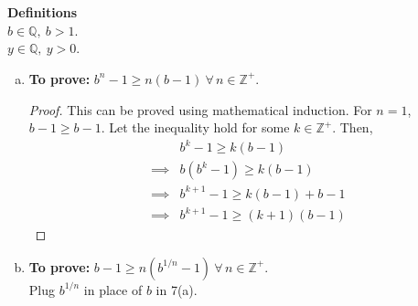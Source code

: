 \documentclass[12pt]{article}
\begin{document}
\section{}
 {\bf Definitions}\\
$b\in \mathbb{Q},\ b > 1$.\\
$y\in \mathbb{Q},\ y > 0$.

\begin{enumerate}[(a)]
      \item
            {\bf To prove:} $b^n-1 \ge n(b-1) \ \forall \, n \in \mathbb{Z}^+$.
            \begin{proof}
                  This can be proved using mathematical induction. For $n=1$,
                  $b-1 \ge b-1$. Let the inequality hold for some $k \in \mathbb{Z}^+$. Then,
                  \begin{align*}
                                 & b^k-1 \ge k(b-1)            \\
                        \implies & b(b^k -1) \ge k(b-1)        \\
                        \implies & b^{k+1} -1 \ge k(b-1) + b-1 \\
                        \implies & b^{k+1} -1 \ge (k+1)(b-1)
                  \end{align*}
            \end{proof}
      \item
            {\bf To prove:} $b-1 \ge n(b^{1/n}-1)\ \forall \, n \in \mathbb{Z}^+$.\\
            Plug $b^{1/n}$ in place of $b$ in 7(a).


\end{enumerate}
\end{document}
